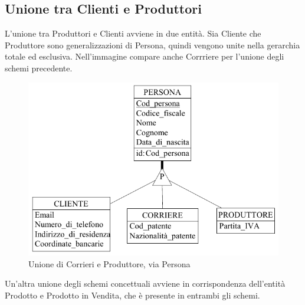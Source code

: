 \documentclass[a4paper,12pt]{report}
\begin{document}
\subsection{Unione tra Clienti e Produttori}

L'unione tra Produttori e Clienti avviene in due entità. Sia Cliente che Produttore sono generalizzazioni di Persona, quindi vengono unite nella gerarchia totale ed esclusiva. Nell'immagine compare anche Corrriere per l'unione degli schemi precedente.
\begin{figure}[H]
	\centering{}
	\includegraphics[width=\textwidth]{img/Unione-Clienti-Produttori1.pdf}
	\caption{Unione di Corrieri e Produttore, via Persona}
\end{figure}
Un'altra unione degli schemi concettuali avviene in corrispondenza dell'entità Prodotto e Prodotto in Vendita, che è presente in entrambi gli schemi. 
\end{document}
